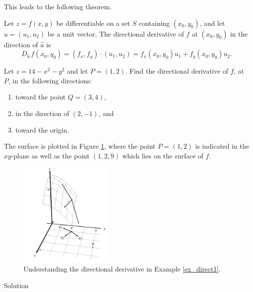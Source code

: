 This leads to the following theorem. 

\begin{theorem}\label{thm:direct_deriv1}
Let $z=f(x,y)$ be differentiable on a set $S$ containing $(x_0,y_0)$, and let $\hat u = \left( u_1,u_2\right)$ be a unit vector. The directional derivative of $f$ at $(x_0,y_0)$ in the direction of $\hat u$ is
$$D_{\hat u\,}f(x_0,y_0)=\left(f_x,f_y\right)\cdot\left(u_1,u_2\right)=f_x(x_0,y_0)u_1 + f_y(x_0,y_0)u_2.$$
\end{theorem}

\begin{example}\label{ex_direct1}
Let $z= 14-x^2-y^2$ and let $P=(1,2)$. Find the directional derivative of $f$, at $P$, in the following directions:
\begin{enumerate}
	\item toward the point $Q=(3,4)$,
	\item in the direction of $\left( 2,-1\right)$, and
	\item toward the origin.
\end{enumerate}

The surface is plotted in Figure \ref{fig_multi_var_13}, where the point $P=(1,2)$ is indicated in the $xy$-plane as well as the point $(1,2,9)$ which lies on the surface of $f$. 

\begin{figure}[H]
	\begin{center}
			\includegraphics[width=0.4\textwidth]{fig_multi_var_13}
	\caption{Understanding the directional derivative in Example \ref{ex_direct1}.}
	\label{fig_multi_var_13}
	\end{center}
\end{figure}

Solution 



\end{example}
